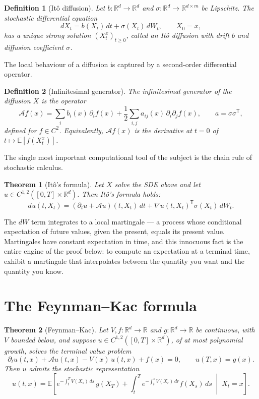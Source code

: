 \documentclass{article}
\newtheorem{theorem}{Theorem}
\newtheorem{definition}{Definition}
\newcommand{\concept}[2]{#1}
\begin{document}
\begin{definition}[It\^o diffusion]
Let $b \colon \mathbb{R}^d \to \mathbb{R}^d$ and $\sigma \colon \mathbb{R}^d \to \mathbb{R}^{d \times m}$ be Lipschitz. The \concept{stochastic differential equation}{sde}
\[
dX_t = b(X_t)\,dt + \sigma(X_t)\,dW_t, \qquad X_0 = x,
\]
has a unique strong solution $(X_t^x)_{t \ge 0}$, called an It\^o diffusion with drift $b$ and diffusion coefficient $\sigma$.
\end{definition}

The local behaviour of a diffusion is captured by a second-order differential operator.

\begin{definition}[Infinitesimal generator]
The \concept{infinitesimal generator}{infinitesimal-generator} of the diffusion $X$ is the operator
\[
\mathcal{A} f(x) = \sum_{i} b_i(x)\, \partial_i f(x) + \frac{1}{2} \sum_{i,j} a_{ij}(x)\, \partial_i \partial_j f(x), \qquad a = \sigma \sigma^{\mathsf{T}},
\]
defined for $f \in C^2$. Equivalently, $\mathcal{A} f(x)$ is the derivative at $t = 0$ of $t \mapsto \mathbb{E}[f(X_t^x)]$.
\end{definition}

The single most important computational tool of the subject is the chain rule of stochastic calculus.

\begin{theorem}[It\^o's formula]
Let $X$ solve the SDE above and let $u \in C^{1,2}([0,T] \times \mathbb{R}^d)$. Then \concept{It\^o's formula}{ito-formula} holds:
\[
du(t, X_t) = \left( \partial_t u + \mathcal{A} u \right)(t, X_t)\,dt + \nabla u(t, X_t)^{\mathsf{T}} \sigma(X_t)\,dW_t.
\]
\end{theorem}

The $dW$ term integrates to a local \concept{martingale}{martingale} --- a process whose \concept{conditional expectation}{conditional-expectation} of future values, given the present, equals its present value. Martingales have constant expectation in time, and this innocuous fact is the entire engine of the proof below: to compute an expectation at a terminal time, exhibit a martingale that interpolates between the quantity you want and the quantity you know.

\section{The Feynman--Kac formula}

\begin{theorem}[Feynman--Kac]
Let $V, f \colon \mathbb{R}^d \to \mathbb{R}$ and $g \colon \mathbb{R}^d \to \mathbb{R}$ be continuous, with $V$ bounded below, and suppose $u \in C^{1,2}([0,T] \times \mathbb{R}^d)$, of at most polynomial growth, solves the terminal value problem
\[
\partial_t u(t,x) + \mathcal{A} u(t,x) - V(x)\,u(t,x) + f(x) = 0, \qquad u(T, x) = g(x).
\]
Then $u$ admits the stochastic representation
\[
u(t,x) = \mathbb{E}\left[ e^{-\int_t^T V(X_s)\,ds}\, g(X_T) + \int_t^T e^{-\int_t^s V(X_r)\,dr} f(X_s)\,ds \;\middle|\; X_t = x \right].
\]
\end{theorem}
\end{document}

